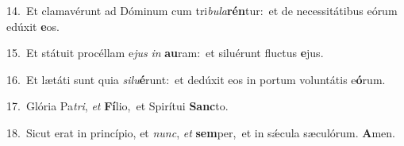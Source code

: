 {\numbfont\textcolor{\numbcolor}{14.}}~Et clamavérunt ad Dóminum cum tri\-\textit{bu}\-\textit{la}\textbf{rén}tur:~\star et de necessitátibus eórum edúxit \textbf{e}\-os.\par
{\numbfont\textcolor{\numbcolor}{15.}}~Et státuit procéllam e\textit{jus} \textit{in} \textbf{au}\-ram:~\star et siluérunt fluctus \textbf{e}\-jus.\par
{\numbfont\textcolor{\numbcolor}{16.}}~Et lætáti sunt quia \textit{si}\-\textit{lu}\textbf{é}runt:~\star et dedúxit eos in portum voluntátis e\-\textbf{ó}\-rum.\par
{\numbfont\textcolor{\numbcolor}{17.}}~Glória Pa\-\textit{tri}\-, \textit{et} \textbf{Fí}\-lio,~\star et Spirítui \textbf{Sanc}\-to.\par
{\numbfont\textcolor{\numbcolor}{18.}}~Sicut erat in princípio, et \textit{nunc}\-, \textit{et} \textbf{sem}\-per,~\star et in sǽcula sæculórum. \textbf{A}\-men.\par
